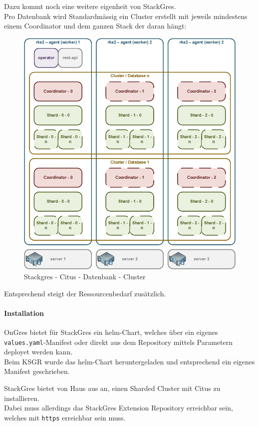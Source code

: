 \begin{flushleft}
    Dazu kommt noch eine weitere eigenheit von StackGres.\\
    Pro Datenbank wird Standardmässig ein Cluster erstellt mit jeweils mindestens einem Coordinator und dem ganzen Stack der daran hängt:
    \begin{figure}[H]
        \centering
        \includegraphics[width=0.8\linewidth]{source/implementation/evaluation/postgresql_ha_solutions/stackgres/stackgres_citus_architecture_clustering}
        \caption{Stackgres - Citus - Datenbank - Cluster}
        \label{fig:stackgres_citus_architecture_clustering}
    \end{figure}
    Entsprechend steigt der Ressourcenbedarf zusätzlich.
\end{flushleft}
\begin{flushleft}
    \paragraph{Installation}
    OnGres bietet für StackGres ein \gls{helm}-Chart, welches über ein eigenes \texttt{values.yaml}-Manifest oder direkt aus dem Repository mittels Parametern deployet werden kann.\\
    Beim KSGR wurde das \gls{helm}-Chart heruntergeladen und entsprechend ein eigenes Manifest geschrieben.
\end{flushleft}
\begin{flushleft}
    StackGres bietet von Haus aus an, einen Sharded Cluster mit Citus zu installieren.\\
    Dabei muss allerdings das StackGres Extension Repository erreichbar sein, welches mit \texttt{https} erreichbar sein muss.
\end{flushleft}
